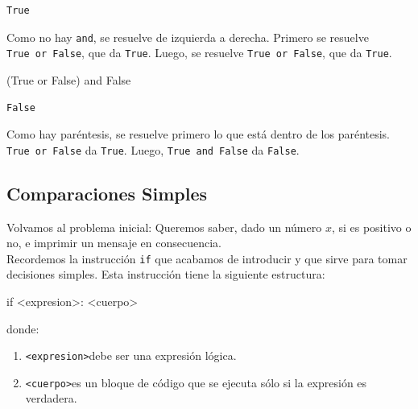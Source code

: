 \documentclass[
  letterpaper,
  DIV=11,
  numbers=noendperiod]{scrreprt}
\newenvironment{Shaded}{\begin{snugshade}}{\end{snugshade}}
\newcommand{\ControlFlowTok}[1]{\textcolor[rgb]{0.00,0.23,0.31}{#1}}
\newcommand{\KeywordTok}[1]{\textcolor[rgb]{0.00,0.23,0.31}{#1}}
\newcommand{\NormalTok}[1]{\textcolor[rgb]{0.00,0.23,0.31}{#1}}
\newcommand{\OperatorTok}[1]{\textcolor[rgb]{0.37,0.37,0.37}{#1}}
\newcommand{\VariableTok}[1]{\textcolor[rgb]{0.07,0.07,0.07}{#1}}
\providecommand{\tightlist}{%
  \setlength{\itemsep}{0pt}\setlength{\parskip}{0pt}}\usepackage{longtable,booktabs,array}
\begin{document}
\begin{tcolorbox}
\begin{verbatim}
True
\end{verbatim}

Como no hay \texttt{and}, se resuelve de izquierda a derecha. Primero se
resuelve \texttt{True\ or\ False}, que da \texttt{True}. Luego, se
resuelve \texttt{True\ or\ False}, que da \texttt{True}.

\begin{Shaded}
\begin{Highlighting}[]
\NormalTok{(}\VariableTok{True} \KeywordTok{or} \VariableTok{False}\NormalTok{) }\KeywordTok{and} \VariableTok{False}
\end{Highlighting}
\end{Shaded}

\begin{verbatim}
False
\end{verbatim}

Como hay paréntesis, se resuelve primero lo que está dentro de los
paréntesis. \texttt{True\ or\ False} da \texttt{True}. Luego,
\texttt{True\ and\ False} da \texttt{False}.

\end{tcolorbox}

\hypertarget{comparaciones-simples}{%
\subsection{Comparaciones Simples}\label{comparaciones-simples}}

Volvamos al problema inicial: Queremos saber, dado un número \(x\), si
es positivo o no, e imprimir un mensaje en consecuencia.\\
Recordemos la instrucción \texttt{if} que acabamos de introducir y que
sirve para tomar decisiones simples. Esta instrucción tiene la siguiente
estructura:

\begin{Shaded}
\begin{Highlighting}[]
\ControlFlowTok{if} \OperatorTok{\textless{}}\NormalTok{expresion}\OperatorTok{\textgreater{}}\NormalTok{:}
    \OperatorTok{\textless{}}\NormalTok{cuerpo}\OperatorTok{\textgreater{}}
\end{Highlighting}
\end{Shaded}

donde:

\begin{enumerate}
\def\labelenumi{\arabic{enumi}.}
\tightlist
\item
  \texttt{\textless{}expresion\textgreater{}}debe ser una expresión
  lógica.
\item
  \texttt{\textless{}cuerpo\textgreater{}}es un bloque de código que se
  ejecuta sólo si la expresión es verdadera.
\end{enumerate}
\end{document}
